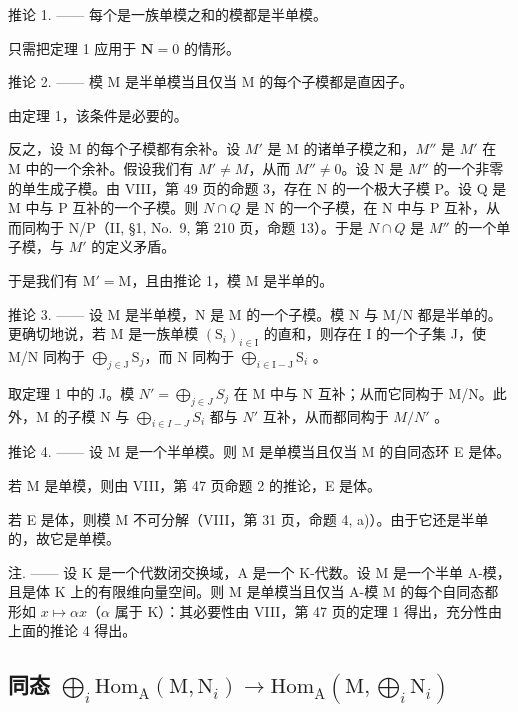 推论 1. —— 每个是一族单模之和的模都是半单模。

只需把定理 1 应用于 \(\mathbf{N} = 0\) 的情形。

推论 2. —— 模 M 是半单模当且仅当 M 的每个子模都是直因子。

由定理 1，该条件是必要的。

反之，设 M 的每个子模都有余补。设 \(M'\) 是 M 的诸单子模之和，\(M''\) 是 \(M'\) 在 M 中的一个余补。假设我们有 \(M' \neq M\)，从而 \(M'' \neq 0\)。设 N 是 \(M''\) 的一个非零的单生成子模。由 VIII，第 49 页的命题 3，存在 N 的一个极大子模 P。设 Q 是 M 中与 P 互补的一个子模。则 \(N \cap Q\) 是 N 的一个子模，在 N 中与 P 互补，从而同构于 N/P（II, §1, No.~9, 第 210 页，命题 13）。于是 \(N \cap Q\) 是 \(M''\) 的一个单子模，与 \(M'\) 的定义矛盾。

于是我们有 \(\mathrm{M}' = \mathrm{M}\)，且由推论 1，模 \(\mathrm{M}\) 是半单的。

推论 3. —— 设 M 是半单模，N 是 M 的一个子模。模 N 与 M/N 都是半单的。更确切地说，若 M 是一族单模 \((\mathrm{S}_i)_{i\in \mathrm{I}}\) 的直和，则存在 I 的一个子集 J，使 M/N 同构于 \(\bigoplus_{j\in \mathrm{J}}\mathrm{S}_j\)，而 N 同构于 \(\bigoplus_{i\in \mathrm{I - J}}\mathrm{S}_i\) 。

取定理 1 中的 J。模 \(N' = \bigoplus_{j \in J} S_j\) 在 M 中与 N 互补；从而它同构于 M/N。此外，M 的子模 N 与 \(\bigoplus_{i \in I-J} S_i\) 都与 \(N'\) 互补，从而都同构于 \(M/N'\) 。

推论 4. —— 设 M 是一个半单模。则 M 是单模当且仅当 M 的自同态环 E 是体。

若 M 是单模，则由 VIII，第 47 页命题 2 的推论，E 是体。

若 E 是体，则模 M 不可分解（VIII，第 31 页，命题 4, a)）。由于它还是半单的，故它是单模。

注. —— 设 K 是一个代数闭交换域，A 是一个 K-代数。设 M 是一个半单 A-模，且是体 K 上的有限维向量空间。则 M 是单模当且仅当 A-模 M 的每个自同态都形如 \(x \mapsto \alpha x\)（\(\alpha\) 属于 K）：其必要性由 VIII，第 47 页的定理 1 得出，充分性由上面的推论 4 得出。

\subsection{\texorpdfstring{同态 \(\bigoplus_{i} \mathrm{Hom}_{\mathrm{A}}(\mathrm{M}, \mathrm{N}_{i}) \longrightarrow \mathrm{Hom}_{\mathrm{A}}(\mathrm{M}, \bigoplus_{i} \mathrm{N}_{i})\)}{同态 \textbackslash bigoplus\_\{i\} \textbackslash mathrm\{Hom\}\_\{\textbackslash mathrm\{A\}\}(\textbackslash mathrm\{M\}, \textbackslash mathrm\{N\}\_\{i\}) \textbackslash longrightarrow \textbackslash mathrm\{Hom\}\_\{\textbackslash mathrm\{A\}\}(\textbackslash mathrm\{M\}, \textbackslash bigoplus\_\{i\} \textbackslash mathrm\{N\}\_\{i\})}}

